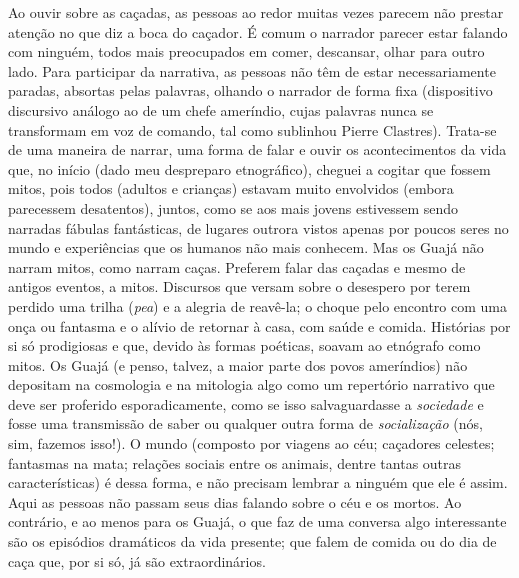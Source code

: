 Ao ouvir sobre as caçadas, as pessoas ao redor muitas vezes parecem não
prestar atenção no que diz a boca do caçador. É comum o narrador parecer
estar falando com ninguém, todos mais preocupados em comer, descansar,
olhar para outro lado. Para participar da narrativa, as pessoas não têm
de estar necessariamente paradas, absortas pelas palavras, olhando o
narrador de forma fixa (dispositivo discursivo análogo ao de um chefe
ameríndio, cujas palavras nunca se transformam em voz de comando, tal
como sublinhou Pierre Clastres). Trata-se de uma maneira de narrar, uma
forma de falar e ouvir os acontecimentos da vida que, no início (dado
meu despreparo etnográfico), cheguei a cogitar que fossem mitos, pois
todos (adultos e crianças) estavam muito envolvidos (embora parecessem
desatentos), juntos, como se aos mais jovens estivessem sendo narradas
fábulas fantásticas, de lugares outrora vistos apenas por poucos seres
no mundo e experiências que os humanos não mais conhecem. Mas os Guajá
não narram mitos, como narram caças. Preferem falar das caçadas e mesmo
de antigos eventos, a mitos. Discursos que versam sobre o desespero por
terem perdido uma trilha (\emph{pea}) e a alegria de reavê-la; o choque
pelo encontro com uma onça ou fantasma e o alívio de retornar à casa,
com saúde e comida. Histórias por si só prodigiosas e que, devido às
formas poéticas, soavam ao etnógrafo como mitos. Os Guajá (e penso,
talvez, a maior parte dos povos ameríndios) não depositam na cosmologia
e na mitologia algo como um repertório narrativo que deve ser proferido
esporadicamente, como se isso salvaguardasse a \emph{sociedade} e fosse
uma transmissão de saber ou qualquer outra forma de \emph{socialização}
(nós, sim, fazemos isso!). O mundo (composto por viagens ao céu;
caçadores celestes; fantasmas na mata; relações sociais entre os
animais, dentre tantas outras características) é dessa forma, e não
precisam lembrar a ninguém que ele é assim. Aqui as pessoas não passam
seus dias falando sobre o céu e os mortos. Ao contrário, e ao menos para
os Guajá, o que faz de uma conversa algo interessante são os episódios
dramáticos da vida presente; que falem de comida ou do dia de caça que,
por si só, já são extraordinários.

